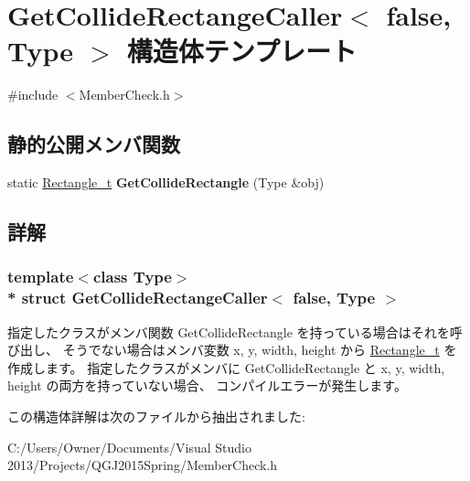 \hypertarget{struct_get_collide_rectange_caller_3_01false_00_01_type_01_4}{}\section{Get\+Collide\+Rectange\+Caller$<$ false, Type $>$ 構造体テンプレート}
\label{struct_get_collide_rectange_caller_3_01false_00_01_type_01_4}


 




{\ttfamily \#include $<$Member\+Check.\+h$>$}

\subsection*{静的公開メンバ関数}
\begin{DoxyCompactItemize}
\item 
static \hyperlink{struct_rectangle__t}{Rectangle\+\_\+t} {\bfseries Get\+Collide\+Rectangle} (Type \&obj)\hypertarget{struct_get_collide_rectange_caller_3_01false_00_01_type_01_4_a088760089fb47af9fd3975b2d36e1b1a}{}\label{struct_get_collide_rectange_caller_3_01false_00_01_type_01_4_a088760089fb47af9fd3975b2d36e1b1a}

\end{DoxyCompactItemize}


\subsection{詳解}
\subsubsection*{template$<$class Type$>$\\*
struct Get\+Collide\+Rectange\+Caller$<$ false, Type $>$}



指定したクラスがメンバ関数 Get\+Collide\+Rectangle を持っている場合はそれを呼び出し、 そうでない場合はメンバ変数 x, y, width, height から \hyperlink{struct_rectangle__t}{Rectangle\+\_\+t} を作成します。 指定したクラスがメンバに Get\+Collide\+Rectangle と x, y, width, height の両方を持っていない場合、 コンパイルエラーが発生します。 

この構造体詳解は次のファイルから抽出されました\+:\begin{DoxyCompactItemize}
\item 
C\+:/\+Users/\+Owner/\+Documents/\+Visual Studio 2013/\+Projects/\+Q\+G\+J2015\+Spring/Member\+Check.\+h\end{DoxyCompactItemize}
